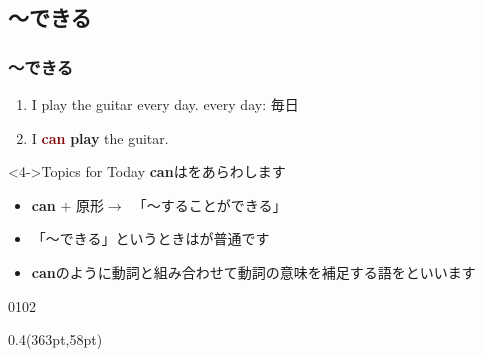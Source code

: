 \documentclass[aspectratio=169,xcolor={dvipsnames,table}]{beamer}
\newcommand{\myaudio}[1]{\href{#1}{\faVolumeUp}}
\begin{document}
\subsection{〜できる}
\begin{frame}[plain]\frametitle{〜できる}
 \Large

\begin{enumerate}
 \item<2-> I play the guitar every day. \hfill{\scriptsize every day: 毎日}
 \item<3-> I \textcolor{Maroon}{\bfseries can} {\bfseries play} the guitar.
\end{enumerate}

\vspace{60pt}

\begin{block}<4->{Topics for Today}
\small
\textbf{can}はをあらわします
\begin{itemize}[square]\small
 \item<4->   {\bfseries can} $+$ 原形$\longrightarrow${\,\,\,}「〜することができる」
 \item<6-> \<「～できる」というときはが普通です
 \item<7-> \textbf{can}のように動詞と組み合わせて動詞の意味を補足する語をといいます
 \end{itemize}
     \end{block}

\vspace*{-20pt}

\mbox{}\hfill{\tiny 0102}\,{\scriptsize \myaudio{./audio/012_can_01.mp3}} 

\begin{textblock*}{0.4\linewidth}(363pt,58pt)
\end{textblock*}

\end{frame}
\end{document}
